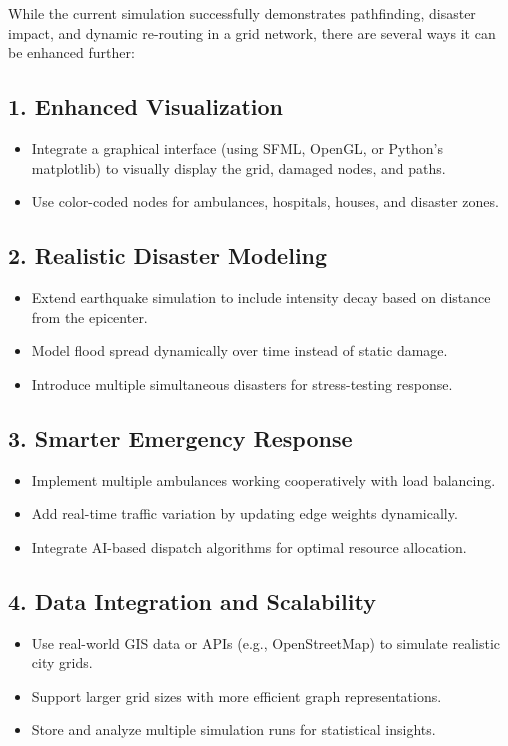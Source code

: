 \documentclass[12pt,a4paper]{report}
\begin{document}
While the current simulation successfully demonstrates pathfinding, disaster impact, and dynamic re-routing in a grid network, there are several ways it can be enhanced further:

\subsection*{1. Enhanced Visualization}
\begin{itemize}
    \item Integrate a graphical interface (using SFML, OpenGL, or Python’s matplotlib) to visually display the grid, damaged nodes, and paths.
    \item Use color-coded nodes for ambulances, hospitals, houses, and disaster zones.
\end{itemize}

\subsection*{2. Realistic Disaster Modeling}
\begin{itemize}
    \item Extend earthquake simulation to include intensity decay based on distance from the epicenter.
    \item Model flood spread dynamically over time instead of static damage.
    \item Introduce multiple simultaneous disasters for stress-testing response.
\end{itemize}

\subsection*{3. Smarter Emergency Response}
\begin{itemize}
    \item Implement multiple ambulances working cooperatively with load balancing.
    \item Add real-time traffic variation by updating edge weights dynamically.
    \item Integrate AI-based dispatch algorithms for optimal resource allocation.
\end{itemize}

\subsection*{4. Data Integration and Scalability}
\begin{itemize}
    \item Use real-world GIS data or APIs (e.g., OpenStreetMap) to simulate realistic city grids.
    \item Support larger grid sizes with more efficient graph representations.
    \item Store and analyze multiple simulation runs for statistical insights.
\end{itemize}
\end{document}
